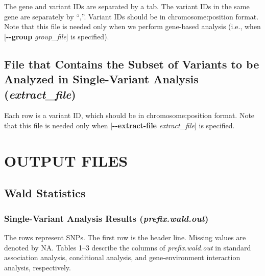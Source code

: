\documentclass[12pt,letter]{article}
\begin{document}
The gene and variant IDs are separated by a tab. The variant IDs in the same gene are separately by ``{\ttfamily ,}''.
Variant IDs should be in {\ttfamily chromosome:position} format. 
Note that this file is needed
only when we perform gene-based analysis (i.e., when [{\bf -{}-group} {\it group\_file}] is specified).

\subsection{File that Contains the Subset of Variants to be Analyzed in Single-Variant Analysis ({\it extract\_file})}

Each row is a variant ID, which should be in {\ttfamily chromosome:position} format. Note that this file is needed
only when [{\bf -{}-extract-file} {\it extract\_file}] is specified.

\section{OUTPUT FILES}
\subsection{Wald Statistics}
\subsubsection{Single-Variant Analysis Results ({\it prefix.wald.out})}
The rows represent SNPs. 
The first row is the header line. Missing values are denoted by {\ttfamily NA}.
Tables 1--3 describe the columns of {\it prefix.wald.out} in standard association analysis,
conditional analysis, and gene-environment interaction analysis, respectively.
\end{document}
